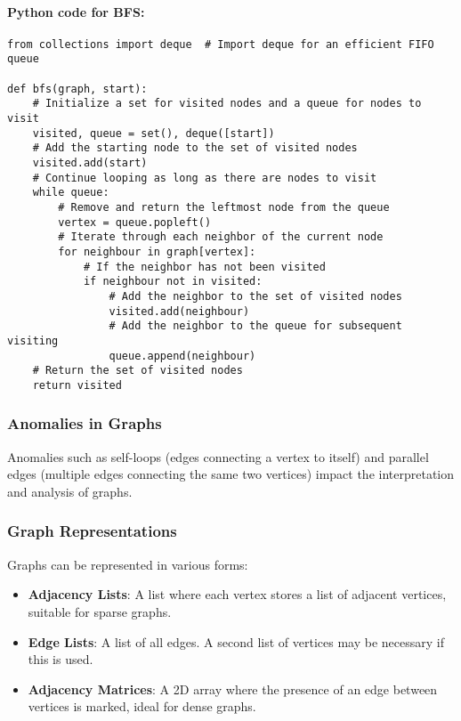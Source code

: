 \documentclass{article}
\begin{document}
\paragraph{Python code for BFS:}
\begin{verbatim}
from collections import deque  # Import deque for an efficient FIFO queue

def bfs(graph, start):
    # Initialize a set for visited nodes and a queue for nodes to visit
    visited, queue = set(), deque([start])
    # Add the starting node to the set of visited nodes
    visited.add(start)
    # Continue looping as long as there are nodes to visit
    while queue:
        # Remove and return the leftmost node from the queue
        vertex = queue.popleft()
        # Iterate through each neighbor of the current node
        for neighbour in graph[vertex]:
            # If the neighbor has not been visited
            if neighbour not in visited:
                # Add the neighbor to the set of visited nodes
                visited.add(neighbour)
                # Add the neighbor to the queue for subsequent visiting
                queue.append(neighbour)
    # Return the set of visited nodes
    return visited
\end{verbatim}

\subsubsection{Anomalies in Graphs}
Anomalies such as self-loops (edges connecting a vertex to itself) and parallel edges (multiple edges connecting the same two vertices) impact the interpretation and analysis of graphs.

\subsubsection{Graph Representations}
Graphs can be represented in various forms:
\begin{itemize}
    \item \textbf{Adjacency Lists}: A list where each vertex stores a list of adjacent vertices, suitable for sparse graphs.
    \item \textbf{Edge Lists}: A list of all edges. A second list of vertices may be necessary if this is used.
    \item \textbf{Adjacency Matrices}: A 2D array where the presence of an edge between vertices is marked, ideal for dense graphs.
\end{itemize}
\end{document}
